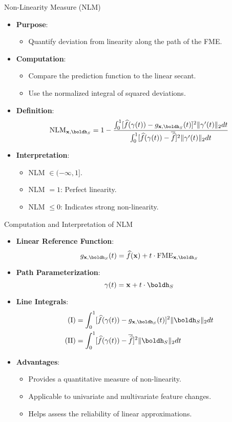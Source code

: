 \documentclass[11pt,compress,t,notes=noshow, aspectratio=169, xcolor=table]{beamer}
\begin{document}
\begin{frame}{Non-Linearity Measure (NLM)}
\begin{itemize}
\item \textbf{Purpose}:
\begin{itemize}
  \item Quantify deviation from linearity along the path of the FME.
\end{itemize}
\item \textbf{Computation}:
\begin{itemize}
  \item Compare the prediction function to the linear secant.
  \item Use the normalized integral of squared deviations.
\end{itemize}
\item \textbf{Definition}:
\[
\text{NLM}_{\xv, \boldh_S} = 1 - \frac{\int_0^1 [\widehat{f}(\gamma(t)) - g_{\xv, \boldh_S}(t)]^2 \Vert \gamma'(t) \Vert_2 dt}{\int_0^1 [\widehat{f}(\gamma(t)) - \overline{\widehat{f}}]^2 \Vert \gamma'(t) \Vert_2 dt}
\]
\item \textbf{Interpretation}:
\begin{itemize}
  \item NLM $\in (-\infty, 1]$.
  \item NLM $=1$: Perfect linearity.
  \item NLM $\leq 0$: Indicates strong non-linearity.
\end{itemize}
\end{itemize}
\end{frame}

\begin{frame}{Computation and Interpretation of NLM}
\begin{itemize}
\item \textbf{Linear Reference Function}:
\[
g_{\xv, \boldh_S}(t) = \widehat{f}(\xv) + t \cdot \text{FME}_{\xv, \boldh_S}
\]
\item \textbf{Path Parameterization}:
\[
\gamma(t) = \xv + t \cdot \boldh_S
\]
\item \textbf{Line Integrals}:
\begin{align*}
\text{(I)} &= \int_0^1 [\widehat{f}(\gamma(t)) - g_{\xv, \boldh_S}(t)]^2 \Vert \boldh_S \Vert_2 dt \\
\text{(II)} &= \int_0^1 [\widehat{f}(\gamma(t)) - \overline{\widehat{f}}]^2 \Vert \boldh_S \Vert_2 dt
\end{align*}
\item \textbf{Advantages}:
\begin{itemize}
\item Provides a quantitative measure of non-linearity.
\item Applicable to univariate and multivariate feature changes.
\item Helps assess the reliability of linear approximations.
\end{itemize}
\end{itemize}
\end{frame}
\end{document}
